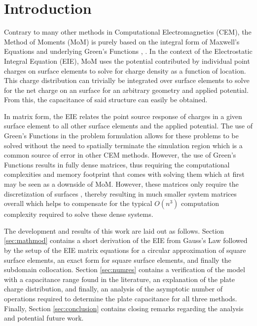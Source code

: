 \section{Introduction}
\label{sec:intro}

Contrary to many other methods in Computational Electromagnetics (CEM), the Method of Moments (MoM) is purely based on the integral form of Maxwell's Equations and underlying Green's Functions \cite{rothlecnotes}, \cite{jin2011theory}. In the context of the Electrostatic Integral Equation (EIE), MoM uses the potential contributed by individual point charges on surface elements to solve for charge density as a function of location. This charge distribution can trivially be integrated over surface elements to solve for the net charge on an surface for an arbitrary geometry and applied potential. From this, the capacitance of said structure can easily be obtained.

In matrix form, the EIE relates the point source response of charges in a given surface element to all other surface elements and the applied potential. The use of Green's Functions in the problem formulation allows for these problems to be solved without the need to spatially terminate the simulation region which is a common source of error in other CEM methods. However, the use of Green's Functions results in fully dense matrices, thus requiring the computational complexities and memory footprint that comes with solving them which at first may be seen as a downside of MoM. However, these matrices only require the discretization of surfaces \cite{rothlecnotes}, \cite{jin2011theory} thereby resulting in much smaller system matrices overall which helps to compensate for the typical $O(n^3)$ computation complexity required to solve these dense systems. 

The development and results of this work are laid out as follows. Section \ref{sec:mathmod} contains a short derivation of the EIE from Gauss's Law followed by the setup of the EIE matrix equations for a circular approximation of square surface elements, an exact form for square surface elements, and finally the subdomain collocation. Section \ref{sec:numres} contains a verification of the model with a capacitance range found in the literature, an explanation of the plate charge distribution, and finally, an analysis of the asymptotic number of operations required to determine the plate capacitance for all three methods. Finally, Section \ref{sec:conclusion} contains closing remarks regarding the analysis and potential future work.